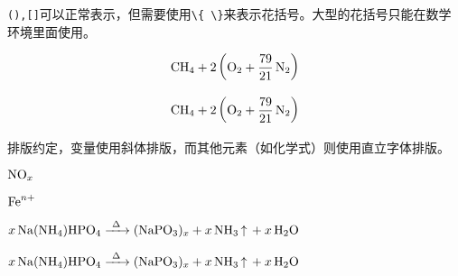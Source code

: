 
\begin{codeshow}
\par
{}\par
{}\par
{}
\end{codeshow}


\verb|(),[]|可以正常表示，但需要使用\verb|\{ \}|来表示花括号。大型的花括号只能在数学环境里面使用。

\begin{codeshow}
\par
{}
\end{codeshow}

\begin{latex}
\[\ce{CH4 + 2 $\left( \ce{O2 + 79/21 N2} \right)$}\]
\end{latex}

\[\ce{CH4 + 2 $\left( \ce{O2 + 79/21 N2} \right)$}\]


\begin{codeshow}
\par
{}\par
{}
\end{codeshow}


\begin{codeshow}
\par
{}
\end{codeshow}

排版约定，变量使用斜体排版，而其他元素（如化学式）则使用直立字体排版。

\begin{codeshow}
$\ce{NO_x}$\par
$\ce{Fe^n+}$
\end{codeshow}

\begin{latex}
$\ce{x Na(NH4)HPO4 ->[\Delta] (NaPO3)_x + x NH3 ^ + x H2O}$
\end{latex}

\begin{center}
    $\ce{x Na(NH4)HPO4 ->[\Delta] (NaPO3)_x + x NH3 ^ + x H2O}$
\end{center}

\begin{codeshow}
\par
\ce{[Pt(\eta^2-C2H4)Cl3]-}
\end{codeshow}

